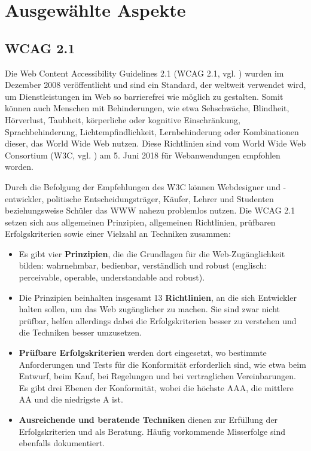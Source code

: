 \chapter{Ausgewählte Aspekte}
\section{WCAG 2.1}
\label{wcag_2_1}
Die Web Content Accessibility Guidelines 2.1 (WCAG 2.1, vgl. \cite{wcag_2_1_2018}) wurden im Dezember 2008 veröffentlicht und sind ein Standard, der weltweit verwendet wird, um Dienstleistungen im Web so barrierefrei wie möglich zu gestalten. Somit können auch Menschen mit Behinderungen, wie etwa Sehschwäche, Blindheit, Hörverlust, Taubheit, körperliche oder kognitive Einschränkung, Sprachbehinderung, Lichtempfindlichkeit, Lernbehinderung oder Kombinationen dieser, das World Wide Web nutzen. Diese Richtlinien sind vom World Wide Web Consortium (W3C, vgl. \cite{w3c_1994}) am 5. Juni 2018 für Webanwendungen empfohlen worden.

Durch die Befolgung der Empfehlungen des W3C können Webdesigner und -entwickler, politische Entscheidungsträger, Käufer, Lehrer und Studenten beziehungsweise Schüler das WWW nahezu problemlos nutzen. Die WCAG 2.1 setzen sich aus allgemeinen Prinzipien, allgemeinen Richtlinien, prüfbaren Erfolgskriterien sowie einer Vielzahl an Techniken zusammen:

\begin{itemize}
	\item Es gibt vier \textbf{Prinzipien}, die die Grundlagen für die Web-Zugänglichkeit bilden: wahrnehmbar, bedienbar, verständlich und robust (englisch: perceivable, operable, understandable and robust).
	\item Die Prinzipien beinhalten insgesamt 13 \textbf{Richtlinien}, an die sich Entwickler halten sollen, um das Web zugänglicher zu machen. Sie sind zwar nicht prüfbar, helfen allerdings dabei die Erfolgskriterien besser zu verstehen und die Techniken besser umzusetzen.
	\item \textbf{Prüfbare Erfolgskriterien} werden dort eingesetzt, wo bestimmte Anforderungen und Tests für die Konformität erforderlich sind, wie etwa beim Entwurf, beim Kauf, bei Regelungen und bei vertraglichen Vereinbarungen. Es gibt drei Ebenen der Konformität, wobei die höchste AAA, die mittlere AA und die niedrigste A ist.
	\item \textbf{Ausreichende und beratende Techniken} dienen zur Erfüllung der Erfolgskriterien und als Beratung. Häufig vorkommende Misserfolge sind ebenfalls dokumentiert.
\end{itemize}

